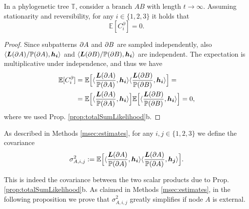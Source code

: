 \begin{appendices}
\begin{prop} \label{prop:CoherenceToZero} In a phylogenetic tree $\mathbb{T}$, consider a branch $AB$ with length $t \to \infty$. Assuming stationarity and reversibility, for any $i \in \{1,2,3\}$ it holds that 
    \[ \mathbb{E}[C^\partial_i] = 0.\]
\end{prop}
\begin{proof}
Since subpatterns ${\partial A}$ and ${\partial B}$ are sampled independently, also $\langle { \bm{L}(\partial A) }/\mathbb{P}({\partial A}),\bm{h_i}\rangle$ and $\langle { \bm{L}(\partial B) }/\mathbb{P}({\partial B}), \bm{h_i} \rangle$ are independent. The expectation is multiplicative under independence, and thus we have
 \begin{align}
    \mathbb{E}[C^\partial_i] &= \mathbb{E}\Big[  \langle \frac{{ \bm{L}(\partial A) }}{\mathbb{P}({\partial A})},\bm{h_i}\rangle \langle \frac{{ \bm{L}(\partial B) }}{\mathbb{P}({\partial B})}, \bm{h_i} \rangle \Big] =  \\
    &=  \mathbb{E}\Big[  \langle \frac{{ \bm{L}(\partial A) }}{\mathbb{P}({\partial A})},\bm{h_i}\rangle \Big] \mathbb{E}\Big[ \langle \frac{{ \bm{L}(\partial B) }}{\mathbb{P}({\partial B})}, \bm{h_i} \rangle \Big] = 0,
\end{align}
where we used Prop. \ref{prop:totalSumLikelihood}b.

\end{proof}

As described in Methods \ref{msec:estimates}, for any $i,j\in \{ 1,2,3\}$ we define the covariance
\begin{equation}\sigma^2_{A,i,j}:=\mathbb{E}\Big[\langle \frac{{ \bm{L}(\partial A) }}{\mathbb{P}({\partial A})},\bm{h_i}\rangle  \langle \frac{{ \bm{L}(\partial A) }}{\mathbb{P}({\partial A})},\bm{h_j}\rangle \Big] 
.\end{equation}

This is indeed the covariance between the two scalar products due to Prop. \ref{prop:totalSumLikelihood}b. As claimed in Methods \ref{msec:estimates}, in the following proposition we prove that $\sigma^2_{A,i,j}$ greatly simplifies if node $A$ is external. 


\end{appendices}
